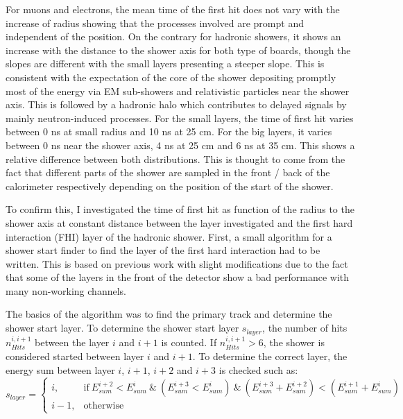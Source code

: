 For muons and electrons, the mean time of the first hit does not vary with the increase of radius showing that the processes involved are prompt and independent of the position. On the contrary for hadronic showers, it shows an increase with the distance to the shower axis for both type of boards, though the slopes are different with the small layers presenting a steeper slope. This is consistent with the expectation of the core of the shower depositing promptly most of the energy via EM sub-showers and relativistic particles near the shower axis. This is followed by a hadronic halo which contributes to delayed signals by mainly neutron-induced processes. For the small layers, the time of first hit varies between 0 ns at small radius and 10 ns at 25 cm. For the big layers, it varies between 0 ns near the shower axis, 4 ns at 25 cm and 6 ns at 35 cm. This shows a relative difference between both distributions. This is thought to come from the fact that different parts of the shower are sampled in the front / back of the calorimeter respectively depending on the position of the start of the shower.

To confirm this, I investigated the time of first hit as function of the radius to the shower axis at constant distance between the layer investigated and the first hard interaction (FHI) layer of the hadronic shower. First, a small algorithm for a shower start finder to find the layer of the first hard interaction had to be written. This is based on previous work \cite{CaN026} with slight modifications due to the fact that some of the layers in the front of the detector show a bad performance with many non-working channels.

The basics of the algorithm was to find the primary track and determine the shower start layer. To determine the shower start layer $s_{layer}$, the number of hits $n_{Hits}^{i, i+1}$ between the layer $i$ and $i+1$ is counted. If $n_{Hits}^{i, i+1} > 6$, the shower is considered started between layer $i$ and $i+1$. To determine the correct layer, the energy sum between layer $i$, $i+1$, $i+2$ and $i+3$ is checked such as:
\begin{equation*}
	s_{layer} =
	\begin{cases}
		i, & \text{if} \: E_{sum}^{i+2} < E_{sum}^{i} \:\&\: (E_{sum}^{i+3} < E_{sum}^{i}) \:\&\: (E_{sum}^{i+3} + E_{sum}^{i+2}) < (E_{sum}^{i+1} + E_{sum}^{i}) \\
		i-1, & \text{otherwise}
	\end{cases}
\end{equation*}

